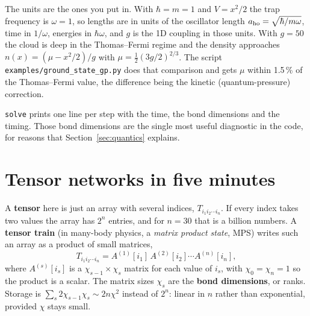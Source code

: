 \documentclass[11pt,a4paper]{article}
\newcommand{\code}[1]{\texttt{#1}}
\begin{document}
The units are the ones you put in. With $\hbar=m=1$ and $V=x^2/2$ the trap frequency
is $\omega=1$, so lengths are in units of the oscillator length
$a_{\rm ho}=\sqrt{\hbar/m\omega}$, time in $1/\omega$, energies in $\hbar\omega$, and
$g$ is the 1D coupling in those units. With $g=50$ the cloud is deep in the
Thomas--Fermi regime and the density approaches $n(x)=(\mu-x^2/2)/g$ with
$\mu=\tfrac12(3g/2)^{2/3}$. The script \code{examples/ground\_state\_gp.py} does that
comparison and gets $\mu$ within 1.5\,\% of the Thomas--Fermi value, the difference
being the kinetic (quantum-pressure) correction.

\code{solve} prints one line per step with the time, the bond dimensions and the
timing. Those bond dimensions are the single most useful diagnostic in the code, for
reasons that Section~\ref{sec:quantics} explains.

\section{Tensor networks in five minutes}
\label{sec:tn}

A \textbf{tensor} here is just an array with several indices, $T_{i_1 i_2\cdots i_n}$.
If every index takes two values the array has $2^n$ entries, and for $n=30$ that is a
billion numbers. A \textbf{tensor train} (in many-body physics, a \emph{matrix product
state}, MPS) writes such an array as a product of small matrices,
\begin{equation}
T_{i_1 i_2\cdots i_n} = A^{(1)}[i_1]\,A^{(2)}[i_2]\cdots A^{(n)}[i_n],
\label{eq:tt}
\end{equation}
where $A^{(s)}[i_s]$ is a $\chi_{s-1}\times\chi_s$ matrix for each value of $i_s$, with
$\chi_0=\chi_n=1$ so the product is a scalar. The matrix sizes $\chi_s$ are the
\textbf{bond dimensions}, or ranks. Storage is $\sum_s 2\chi_{s-1}\chi_s\sim 2n\chi^2$
instead of $2^n$: linear in $n$ rather than exponential, provided $\chi$ stays small.
\end{document}
